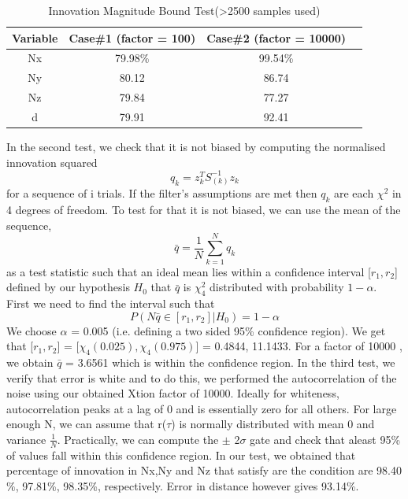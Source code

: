 \documentclass[]{article}
\begin{document}
{\begin{table}[ht]
\caption{Innovation Magnitude Bound Test(\textgreater 2500 samples used)} %
\centering %
\begin{tabular}{c c c c} %
\hline\hline %
Variable & Case\#1 (factor = 100) & Case\#2 (factor = 10000)  \\ [0.5ex] %
\hline %
    Nx 	& 79.98\% 	& 99.54\%\\
    Ny 	& 80.12 	& 86.74 \\
    Nz 	& 79.84 	& 77.27 \\
    d 	& 79.91 	&	92.41 \\ [1ex] %
\hline %
\end{tabular}
\label{table:firstTest} %
\end{table}
In the second test, we check that it is not biased by computing the normalised innovation squared
\begin{equation}
	q_{k} = z_{k}^{T} S_(k)^{-1} z_{k}
\end{equation}
for a sequence of i trials. If the filter's assumptions are met then $q_{k}$ are each $\chi^{2}$ in 4 degrees of freedom. To test for that it is not biased, we can use the mean of the sequence,
\begin{equation}
	\bar{q} = \frac{1}{N}\sum_{k=1}^N {q_k}
\end{equation}
as a test statistic such that an ideal mean lies within a confidence interval [$r_{1}, r_{2}$] defined by our hypothesis $H_0$ that $\bar{q}$ is  $\chi_{4}^{2}$ distributed with probability $1-\alpha$. First we need to find the interval such that
\begin{equation}
P(N\bar{q}\in [r_{1}, r_{2}] | H_{0}) = 1 - \alpha 
\end{equation}
We choose $\alpha$ = 0.005 (i.e. defining a two sided 95\% confidence region). We get that
[$r_{1}, r_{2}$] = [$\chi_{4}(0.025), \chi_{4}(0.975)$] = 0.4844, 11.1433. For a factor of 10000 , we obtain $\bar{q}$ = 3.6561 which is within the confidence region.
In the third test, we verify that error is white and to do this, we performed the autocorrelation of the noise using our obtained Xtion factor of 10000. Ideally for whiteness, autocorrelation peaks at a lag of 0 and is essentially zero for all others. For large enough N, we can assume that r($\tau$) is normally distributed with mean 0 and variance $\frac{1}{N}$. Practically, we can compute the $\pm$ 2$\sigma$ gate and check that aleast 95\% of values fall within this confidence region. In our test, we obtained that percentage of innovation in Nx,Ny and Nz that satisfy are the condition are 98.40$\%$, 97.81\%, 98.35\%, respectively. Error in distance however gives 93.14\%. 
}
\end{document}
